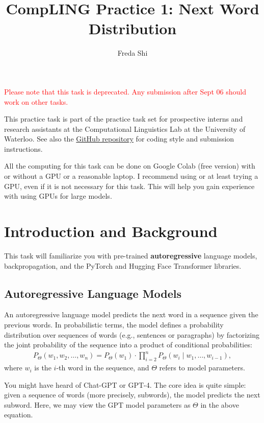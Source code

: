 \documentclass[12pt, letterpaper]{article}
\begin{document}
\title{CompLING Practice 1: Next Word Distribution}
\author{Freda Shi}
\maketitle

\textcolor{red}{Please note that this task is deprecated. Any submission after Sept 06 should work on other tasks.}

This practice task is part of the practice task set for prospective interns and research assistants at the Computational Linguistics Lab at the University of Waterloo.
See also the \href{https://github.com/compling-wat/ura-practice}{GitHub repository} for coding style and submission instructions.

All the computing for this task can be done on Google Colab (free version) with or without a GPU or a reasonable laptop.
I recommend using or at least trying a GPU, even if it is not necessary for this task.
This will help you gain experience with using GPUs for large models.

\section{Introduction and Background}
This task will familiarize you with pre-trained \textbf{autoregressive} language models, backpropagation, and the PyTorch and Hugging Face Transformer libraries.
\subsection{Autoregressive Language Models}
An autoregressive language model predicts the next word in a sequence given the previous words.
In probabilistic terms, the model defines a probability distribution over sequences of words (e.g., sentences or paragraphs) by factorizing the joint probability of the sequence into a product of conditional probabilities:
\begin{align*}
    P_\Theta(w_1, w_2, \ldots, w_n) = P_\Theta(w_1) \cdot \prod_{i=2}^n P_\Theta(w_i \mid w_1, \ldots, w_{i-1}),
\end{align*}
where $w_i$ is the $i$-th word in the sequence, and $\Theta$ refers to model parameters.

You might have heard of Chat-GPT or GPT-4.
The core idea is quite simple: given a sequence of words (more precisely, subwords), the model predicts the next subword.
Here, we may view the GPT model parameters as $\Theta$ in the above equation.
\end{document}
